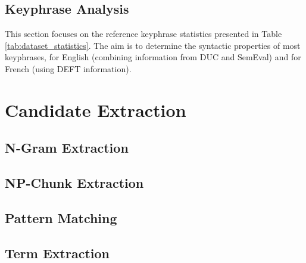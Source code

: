   \subsection{Keyphrase Analysis}
  \label{subsec:keyphrase_analysis}
    This section focuses on the reference keyphrase statistics presented in
    Table \ref{tab:dataset_statistics}. The aim is to determine the syntactic
    properties of most keyphrases, for English (combining information from DUC
    and SemEval) and for French (using DEFT information).


\section{Candidate Extraction}
\label{sec:candidate_extraction}

  \subsection{N-Gram Extraction}
  \label{subsec:n_gram_extraction}
  \subsection{NP-Chunk Extraction}
  \label{subsec:np_chunk_extraction}
  \subsection{Pattern Matching}
  \label{subsec:pattern_matching}
  \subsection{Term Extraction}
  \label{subsec:term_extraction}

